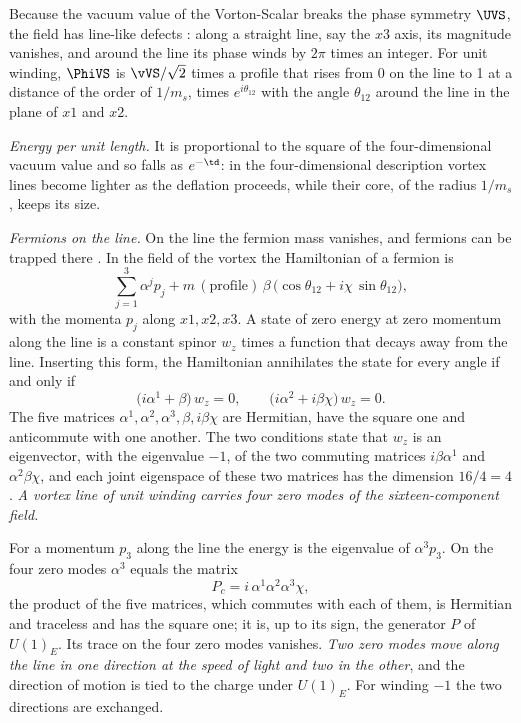 Because the vacuum value of the Vorton-Scalar breaks the phase symmetry $\UVS$, the field has
line-like defects \cite{NielsenOlesen1973}: along a straight line, say the $x3$ axis, its magnitude
vanishes, and around the line its phase winds by $2\pi$ times an integer. For unit winding,
$\PhiVS$ is $\vVS/\sqrt2$ times a profile that rises from 0 on the line to 1 at a distance of the
order of $1/m_s$, times $e^{i\theta_{12}}$ with the angle $\theta_{12}$ around the line in the plane
of $x1$ and $x2$.

\emph{Energy per unit length.} It is proportional to the square of the four-dimensional vacuum
value and so falls as $e^{-\td}$: in the four-dimensional description vortex lines become lighter as
the deflation proceeds, while their core, of the radius $1/m_s$, keeps its size.

\emph{Fermions on the line.} On the line the fermion mass vanishes, and fermions can be trapped
there \cite{JackiwRossi1981}. In the field of the vortex the Hamiltonian of a fermion is
\begin{equation}
\sum_{j=1}^{3}\alpha^{j}p_j+m\,(\text{profile})\,\beta\,\big(\cos\theta_{12}+i\chi\,\sin\theta_{12}\big),
\end{equation}
with the momenta $p_j$ along $x1,x2,x3$. A state of zero energy at zero momentum along the line is a
constant spinor $w_z$ times a function that decays away from the line. Inserting this form, the
Hamiltonian annihilates the state for every angle if and only if
\begin{equation}
\big(i\alpha^{1}+\beta\big)\,w_z=0,\qquad\big(i\alpha^{2}+i\beta\chi\big)\,w_z=0 .
\label{eq:zeromode}
\end{equation}
The five matrices $\alpha^{1},\alpha^{2},\alpha^{3},\beta,i\beta\chi$ are Hermitian, have the square
one and anticommute with one another. The two conditions state that $w_z$ is an eigenvector, with the
eigenvalue $-1$, of the two commuting matrices $i\beta\alpha^{1}$ and $\alpha^{2}\beta\chi$, and each
joint eigenspace of these two matrices has the dimension $16/4=4$. \emph{A vortex line of unit
winding carries four zero modes of the sixteen-component field.}

For a momentum $p_3$ along the line the energy is the eigenvalue of $\alpha^{3}p_3$. On the four
zero modes $\alpha^{3}$ equals the matrix
\begin{equation}
P_c=i\,\alpha^{1}\alpha^{2}\alpha^{3}\chi,
\end{equation}
the product of the five matrices, which commutes with each of them, is Hermitian and traceless and
has the square one; it is, up to its sign, the generator $P$ of $U(1)_E$. Its trace on the four zero
modes vanishes. \emph{Two zero modes move along the line in one direction at the speed of light and
two in the other}, and the direction of motion is tied to the charge under $U(1)_E$. For winding $-1$
the two directions are exchanged.

